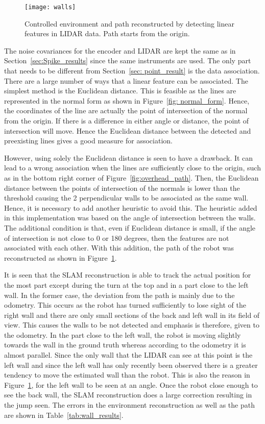 \begin{figure}
\centering
\texttt{[image: walls]}
\caption{Controlled environment and path reconstructed by detecting linear features in LIDAR data. Path starts from the origin.}
\label{fig:wall_result}
\end{figure}

The noise covariances for the encoder and LIDAR are kept the same as in Section~\ref{sec:Spike_results} since the same instruments are used. The only part that needs to be different from Section~\ref{sec: point_result} is the data association. There are a large number of ways that a linear feature can be associated. The simplest method is the Euclidean distance. This is feasible as the lines are represented in the normal form as shown in Figure~\ref{fig: normal_form}. Hence, the coordinates of the line are actually the point of intersection of the normal from the origin. If there is a difference in either angle or distance, the point of intersection will move. Hence the Euclidean distance between the detected and preexisting lines gives a good measure for association.

However, using solely the Euclidean distance is seen to have a drawback. It can lead to a wrong association when the lines are sufficiently close to the origin, such as in the bottom right corner of Figure~\ref{fig:overhead_path}. Then, the Euclidean distance between the points of intersection of the normals is lower than the threshold causing the 2 perpendicular walls to be associated as the same wall. Hence, it is necessary to add another heuristic to avoid this. The heuristic added in this implementation was based on the angle of intersection between the walls. The additional condition is that, even if Euclidean distance is small, if the angle of intersection is not close to 0 or 180 degrees, then the features are not associated with each other. With this addition, the path of the robot was reconstructed as shown in Figure~\ref{fig:wall_result}.


It is seen that the SLAM reconstruction is able to track the actual position for the most part except during the turn at the top and in a part close to the left wall. In the former case, the deviation from the path is mainly due to the odometry. This occurs as the robot has turned sufficiently to lose sight of the right wall and there are only small sections of the back and left wall in its field of view. This causes the walls to be not detected and emphasis is therefore, given to the odometry. In the part close to the left wall, the robot is moving slightly towards the wall in the ground truth whereas according to the odometry it is almost parallel. Since the only wall that the LIDAR can see at this point is the left wall and since the left wall has only recently been observed there is a greater tendency to move the estimated wall than the robot. This is also the reason in Figure~\ref{fig:wall_result}, for the left wall to be seen at an angle. Once the robot close enough to see the back wall, the SLAM reconstruction does a large correction resulting in the jump seen. The errors in the environment reconstruction as well as the path are shown in Table~\ref{tab:wall_results}. 

